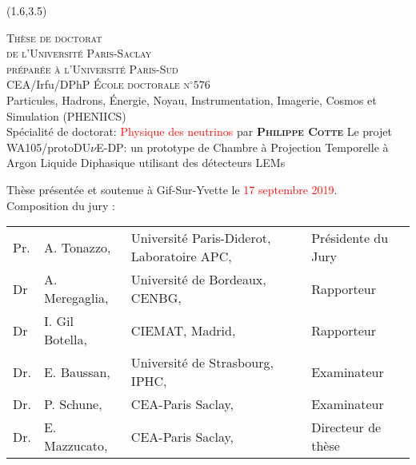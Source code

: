 \begin{textblock}{12.8}(1.6,3.5)
  \begin{center}
    \textcolor{pheniics_purple}{ %
      \LARGE\textsc{Thèse de doctorat\\ de l'Université Paris-Saclay} \\
      \LARGE{\textsc{préparée à l'Université Paris-Sud}} \\ \bigskip
  	  \color{black} %
	  \vfill \vfill
	  \Large{CEA/Irfu/DPhP}
	  \vfill \vfill
      \Large\textsc{École doctorale n$^{\circ}576$}\\ %
      \Large{Particules, Hadrons, Énergie, Noyau, Instrumentation, Imagerie, Cosmos et Simulation (PHENIICS)} \\
	  \Large{Spécialité de doctorat: \textcolor{red}{Physique des neutrinos} } %
      \vfill  
   	  \Large{par}
   	  \vfill
   	  \LARGE{\textbf{\textsc{Philippe Cotte}}} %
      \vfill
      \Large{Le projet WA105/protoDU$\nu$E-DP: un prototype de Chambre à Projection Temporelle à Argon Liquide Diphasique utilisant des détecteurs LEMs} %
      \vfill
    }
  \end{center}

  \small{
    \begin{flushleft}
    Thèse présentée et soutenue à Gif-Sur-Yvette le \textcolor{red}{17 septembre 2019}. \\
    \bigskip
    Composition du jury :
    \end{flushleft}

    \begin{center}
      \begin{tabular}{llll}

	
	    Pr.		& A. Tonazzo,			& Université Paris-Diderot, Laboratoire
APC,		& Présidente du Jury	\\
  	    Dr		& A. Meregaglia,			& Université de Bordeaux, CENBG,		& Rapporteur			\\	
  	    Dr		& I. Gil Botella,			& CIEMAT, Madrid,		& Rapporteur			\\
  	    Dr.		& E. Baussan,			& Université de Strasbourg, IPHC,		& Examinateur		\\
  	    Dr.		& P. Schune,			& CEA-Paris Saclay,		& Examinateur		\\
	    Dr.		& E. Mazzucato,			& CEA-Paris Saclay,		& Directeur de thèse	\\  
   
      \end{tabular}    
    \end{center}
  }

\end{textblock}

